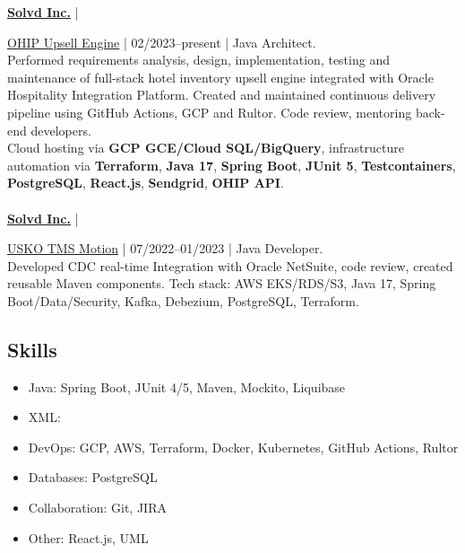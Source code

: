 \documentclass{h1alexbel}
\begin{document}
    \textbf{\href{https://www.solvd.com}{Solvd Inc.}} | {\href{https://upsell.northviewhg.com}{OHIP Upsell Engine} | 02/2023--present | Java Architect.\\
    Performed requirements analysis, design, implementation, testing and maintenance
    of full-stack hotel inventory upsell engine integrated with Oracle Hospitality Integration Platform.
    Created and maintained continuous delivery pipeline using GitHub Actions, GCP and Rultor.
    Code review, mentoring back-end developers.\\
    Cloud hosting via \textbf{GCP GCE/Cloud SQL/BigQuery},
    infrastructure automation via \textbf{Terraform},
    \textbf{Java 17},
    \textbf{Spring Boot},
    \textbf{JUnit 5},
    \textbf{Testcontainers},
    \textbf{PostgreSQL},
    \textbf{React.js},
    \textbf{Sendgrid},
    \textbf{OHIP API}.
    \\\\
    \textbf{\href{https://www.solvd.com}{Solvd Inc.}} | {\href{https://motiontms.com}{USKO TMS Motion} | 07/2022--01/2023 | Java Developer.\\
    Developed CDC real-time Integration with Oracle NetSuite, code review, created reusable Maven components.
    Tech stack: AWS EKS/RDS/S3, Java 17, Spring Boot/Data/Security, Kafka, Debezium, PostgreSQL, Terraform.
    \vspace{-7pt}


    \subsection*{Skills}
    \vspace{-7pt}
    \small
    \begin{itemize}
        \item Java: Spring Boot, JUnit 4/5, Maven, Mockito, Liquibase
        \vspace{-7pt}
        \item XML:
        \vspace{-7pt}
        \item DevOps: GCP, AWS, Terraform, Docker, Kubernetes, GitHub Actions, Rultor
        \vspace{-7pt}
        \item Databases: PostgreSQL
        \vspace{-7pt}
        \item Collaboration: Git, JIRA
        \vspace{-7pt}
        \item Other: React.js, UML
        \vspace{-7pt}
    \end{itemize}

}}
\end{document}
